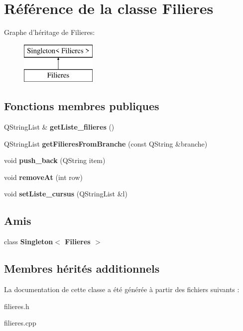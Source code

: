 \hypertarget{class_filieres}{\section{Référence de la classe Filieres}
\label{class_filieres}
}
Graphe d'héritage de Filieres\+:\begin{figure}[H]
\begin{center}
\leavevmode
\includegraphics[height=2.000000cm]{class_filieres}
\end{center}
\end{figure}
\subsection*{Fonctions membres publiques}
\begin{DoxyCompactItemize}
\item 
\hypertarget{class_filieres_a2f0f1b73e40690a9350b288f9494b7a8}{Q\+String\+List \& {\bfseries get\+Liste\+\_\+filieres} ()}\label{class_filieres_a2f0f1b73e40690a9350b288f9494b7a8}

\item 
\hypertarget{class_filieres_ac9bf3413a5759e42dc3dc90087185888}{Q\+String\+List {\bfseries get\+Filieres\+From\+Branche} (const Q\+String \&branche)}\label{class_filieres_ac9bf3413a5759e42dc3dc90087185888}

\item 
\hypertarget{class_filieres_ae1ac69e61f3a735b69d07ee1edd3351b}{void {\bfseries push\+\_\+back} (Q\+String item)}\label{class_filieres_ae1ac69e61f3a735b69d07ee1edd3351b}

\item 
\hypertarget{class_filieres_ae630a91b289fd80c964ef8b55c0e560c}{void {\bfseries remove\+At} (int row)}\label{class_filieres_ae630a91b289fd80c964ef8b55c0e560c}

\item 
\hypertarget{class_filieres_af2e5fc56a24633d51c22a9b6b5c9b9fd}{void {\bfseries set\+Liste\+\_\+cursus} (Q\+String\+List \&l)}\label{class_filieres_af2e5fc56a24633d51c22a9b6b5c9b9fd}

\end{DoxyCompactItemize}
\subsection*{Amis}
\begin{DoxyCompactItemize}
\item 
\hypertarget{class_filieres_ac878913a6b3e427b3fd78e64c79c1d42}{class {\bfseries Singleton$<$ Filieres $>$}}\label{class_filieres_ac878913a6b3e427b3fd78e64c79c1d42}

\end{DoxyCompactItemize}
\subsection*{Membres hérités additionnels}


La documentation de cette classe a été générée à partir des fichiers suivants \+:\begin{DoxyCompactItemize}
\item 
filieres.\+h\item 
filieres.\+cpp\end{DoxyCompactItemize}
